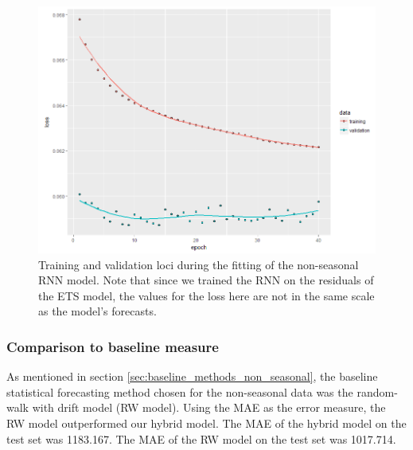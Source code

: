 \documentclass[a4paper,12pt]{article}
\theoremstyle{definition}
\begin{document}
\begin{figure}[ht]
	\centering
	\includegraphics[width=\textwidth]{figures/non_seasonal_residual_history.png}
	\caption{Training and validation loci during the fitting of the non-seasonal RNN model. Note that since we trained the RNN on the residuals of the ETS model, the values for the loss here are not in the same scale as the model's forecasts.}
	\label{fig:non_seasonal_residual_history}
\end{figure}

\subsubsection{Comparison to baseline measure}
As mentioned in section \ref{sec:baseline_methods_non_seasonal}, the baseline statistical forecasting method chosen for the non-seasonal data was the random-walk with drift model (RW model). Using the MAE as the error measure, the RW model outperformed our hybrid model. The MAE of the hybrid model on the test set was 1183.167. The MAE of the RW model on the test set was 1017.714.
\end{document}
